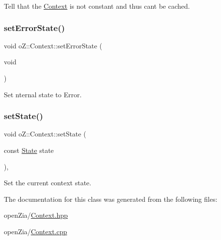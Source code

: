 Tell that the \mbox{\hyperlink{classo_z_1_1_context}{Context}} is not constant and thus can\textquotesingle{}t be cached. 

\mbox{\label{classo_z_1_1_context_a036d993634650ee8414c2f12d49d0204}} 
\subsubsection{\texorpdfstring{setErrorState()}{setErrorState()}}
{\footnotesize\ttfamily void o\+Z\+::\+Context\+::set\+Error\+State (\begin{DoxyParamCaption}\item[{void}]{ }\end{DoxyParamCaption})\hspace{0.3cm}{\ttfamily [inline]}}



Set nternal state to Error. 

\mbox{\label{classo_z_1_1_context_aa71b839188393f2328ad9f9c5da08004}} 
\subsubsection{\texorpdfstring{setState()}{setState()}}
{\footnotesize\ttfamily void o\+Z\+::\+Context\+::set\+State (\begin{DoxyParamCaption}\item[{const \mbox{\hyperlink{namespaceo_z_a356b278f7c65def0cae75fca8cae268e}{State}}}]{state }\end{DoxyParamCaption})\hspace{0.3cm}{\ttfamily [inline]}, {\ttfamily [noexcept]}}



Set the current context\textquotesingle{} state. 



The documentation for this class was generated from the following files\+:\begin{DoxyCompactItemize}
\item 
open\+Zia/\mbox{\hyperlink{_context_8hpp}{Context.\+hpp}}\item 
open\+Zia/\mbox{\hyperlink{_context_8cpp}{Context.\+cpp}}\end{DoxyCompactItemize}
